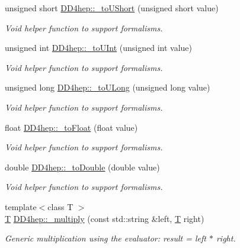 \begin{DoxyCompactItemize}
unsigned short \hyperlink{group___d_d4_h_e_p___g_e_o_m_e_t_r_y_gaff8a702098e20c2aa071703222b5a73e}{D\+D4hep\+::\+\_\+to\+U\+Short} (unsigned short value)
\begin{DoxyCompactList}\small\item\em Void helper function to support formalisms. \end{DoxyCompactList}\item 
unsigned int \hyperlink{group___d_d4_h_e_p___g_e_o_m_e_t_r_y_gab71d50eed88236ff6d21b5a29c7bba70}{D\+D4hep\+::\+\_\+to\+U\+Int} (unsigned int value)
\begin{DoxyCompactList}\small\item\em Void helper function to support formalisms. \end{DoxyCompactList}\item 
unsigned long \hyperlink{group___d_d4_h_e_p___g_e_o_m_e_t_r_y_gac59edb5f6a7d0fe5aa11255ef5b48bae}{D\+D4hep\+::\+\_\+to\+U\+Long} (unsigned long value)
\begin{DoxyCompactList}\small\item\em Void helper function to support formalisms. \end{DoxyCompactList}\item 
float \hyperlink{group___d_d4_h_e_p___g_e_o_m_e_t_r_y_gaab1bf6ab129e49ea7ff106c361f73978}{D\+D4hep\+::\+\_\+to\+Float} (float value)
\begin{DoxyCompactList}\small\item\em Void helper function to support formalisms. \end{DoxyCompactList}\item 
double \hyperlink{group___d_d4_h_e_p___g_e_o_m_e_t_r_y_ga3d960b4bfc48c6c6bce83e0021da377f}{D\+D4hep\+::\+\_\+to\+Double} (double value)
\begin{DoxyCompactList}\small\item\em Void helper function to support formalisms. \end{DoxyCompactList}\item 
{\footnotesize template$<$class T $>$ }\\\hyperlink{class_t}{T} \hyperlink{group___d_d4_h_e_p___g_e_o_m_e_t_r_y_gab860c2299e2eb50e537c5079fb0c9c51}{D\+D4hep\+::\+\_\+multiply} (const std\+::string \&left, \hyperlink{class_t}{T} right)
\begin{DoxyCompactList}\small\item\em Generic multiplication using the evaluator\+: result = left $\ast$ right. \end{DoxyCompactList}\item 

\end{DoxyCompactItemize}

